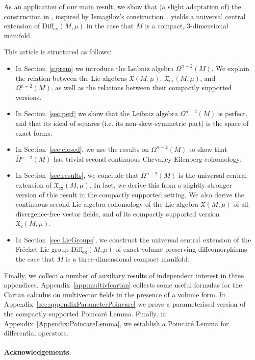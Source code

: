 \documentclass{article}
\newcommand{\ex}{\mathrm{ex}}
\newcommand{\fX}{\mathfrak{X}}
\newcommand{\Diff}{\mathrm{Diff}}
\newcommand{\oline}{\overline}
\theoremstyle{definition}
\begin{document}
As an application of our main result, we show that (a slight adaptation of) the construction in \cite{janssensHowActionThat2024}, inspired by Ismagilov's construction~\cite{Ismagilov1980}, yields a universal central extension of $\Diff_{\ex}(M,\mu)$ in the case that $M$ is a compact, 3-dimensional manifold.

This article is structured as follows:
\begin{itemize}
    \item In Section~\ref{s:prem} we introduce the Leibniz algebra $\Omega^{n-2}(M)$. We explain the  
    relation between the Lie algebras $\mathfrak X(M,\mu)$,  $\mathfrak X_{\ex}(M,\mu)$, and
    $\oline\Omega{}^{n-2}(M)$, as well as the relations between their compactly supported versions.
    \item In Section~\ref{sec:perf} we show that the Leibniz algebra $\Omega^{n-2}(M)$ is perfect, and that its ideal of squares (i.e. its non-skew-symmetric part) 
    is the space of exact forms.
    \item In Section~\ref{sec:closed}, we use the results on $\Omega^{n-2}(M)$ to show that $\oline{\Omega}{}^{n-2}(M)$ has trivial second continuous Chevalley-Eilenberg cohomology. 
    \item In Section~\ref{sec:results}, we conclude that $\oline{\Omega}{}^{n-2}(M)$ is the universal central extension of  $\mathfrak X_{\ex}(M,\mu)$. 
    In fact, we derive this from a slightly stronger version of this result in the compactly supported setting. We also derive the continuous second Lie algebra cohomology of the Lie algebra $\fX(M,\mu)$ of all divergence-free vector fields, and of its compactly supported version $\fX_{c}(M,\mu)$.
    \item In Section~\ref{sec:LieGroups}, we construct the universal central extension of the Fréchet Lie group $\Diff_{\ex}(M,\mu)$ of exact volume-preserving 
    diffeomorphisms the case that $M$ is a three-dimensional compact manifold.
\end{itemize}
Finally, we collect a number of auxiliary results of independent interest in three appendices. Appendix~\ref{app:multivfcartan} collects some useful formulas for the Cartan calculus on multivector fields in the presence of a volume form. 
In Appendix~\ref{sec:appendixParameterPoincare} we prove a parameterised version of the compactly supported Poincar\'e Lemma. Finally, in Appendix~\ref{Appendix:PoincareLemma}, we establish a Poincar\'e Lemma for differential operators.


\paragraph*{Acknowledgements}
\end{document}
